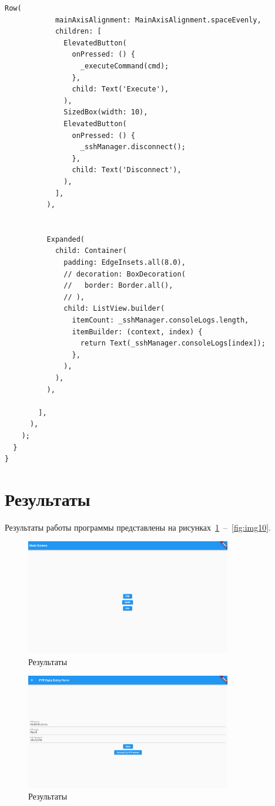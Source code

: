 \documentclass[a4paper, 14pt]{extarticle}
\begin{document}
\begin{lstlisting}[language={},caption={FTP-клиент,  SSH-клиент и SMTP-клиент},label={lst:code1}]
          Row(
            mainAxisAlignment: MainAxisAlignment.spaceEvenly,
            children: [
              ElevatedButton(
                onPressed: () {
                  _executeCommand(cmd);
                },
                child: Text('Execute'),
              ),
              SizedBox(width: 10),
              ElevatedButton(
                onPressed: () {
                  _sshManager.disconnect();
                },
                child: Text('Disconnect'),
              ),
            ],
          ),


          Expanded(
            child: Container(
              padding: EdgeInsets.all(8.0),
              // decoration: BoxDecoration(
              //   border: Border.all(),
              // ),
              child: ListView.builder(
                itemCount: _sshManager.consoleLogs.length,
                itemBuilder: (context, index) {
                  return Text(_sshManager.consoleLogs[index]);
                },
              ),
            ),
          ),

        ],
      ),
    );
  }
}
\end{lstlisting}

\section{Результаты}\label{Sect::res}

Результаты работы программы представлены на рисунках~\ref{fig:img1}~--~\ref{fig:img10}.   

\begin{figure}[!htb]
	\centering
	\includegraphics[width=0.8\textwidth]{img1}
\caption{Результаты}
\label{fig:img1}
\end{figure}

\begin{figure}[!htb]
	\centering
	\includegraphics[width=0.8\textwidth]{img2}
\caption{Результаты}
\label{fig:img2}
\end{figure}
\end{document}
